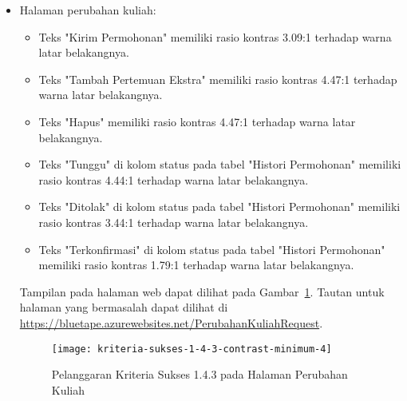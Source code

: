 \begin{itemize}
    \item Halaman perubahan kuliah: 
    \begin{itemize}
        \item Teks "Kirim Permohonan" memiliki rasio kontras 3.09:1 terhadap warna latar belakangnya.
        \item Teks "Tambah Pertemuan Ekstra" memiliki rasio kontras 4.47:1 terhadap warna latar belakangnya.
        \item Teks "Hapus" memiliki rasio kontras 4.47:1 terhadap warna latar belakangnya.
        \item Teks "Tunggu" di kolom status pada tabel "Histori Permohonan" memiliki rasio kontras 4.44:1 terhadap warna latar belakangnya.
        \item Teks "Ditolak" di kolom status pada tabel "Histori Permohonan" memiliki rasio kontras 3.44:1 terhadap warna latar belakangnya.
        \item Teks "Terkonfirmasi" di kolom status pada tabel "Histori Permohonan" memiliki rasio kontras 1.79:1 terhadap warna latar belakangnya.
    \end{itemize}
    Tampilan pada halaman web dapat dilihat pada \mbox{Gambar \ref{fig:1.4.3_contrast_minimum_4}}. Tautan untuk halaman yang bermasalah dapat dilihat di \url{https://bluetape.azurewebsites.net/PerubahanKuliahRequest}.
    \begin{figure}[H]
        \centering  
        \texttt{[image: kriteria-sukses-1-4-3-contrast-minimum-4]}  
        \caption[Pelanggaran Kriteria Sukses 1.4.3 pada Halaman Perubahan Kuliah]{Pelanggaran Kriteria Sukses 1.4.3 pada Halaman Perubahan Kuliah}
        \label{fig:1.4.3_contrast_minimum_4}  
    \end{figure} 
    
    \newpage


\end{itemize}

